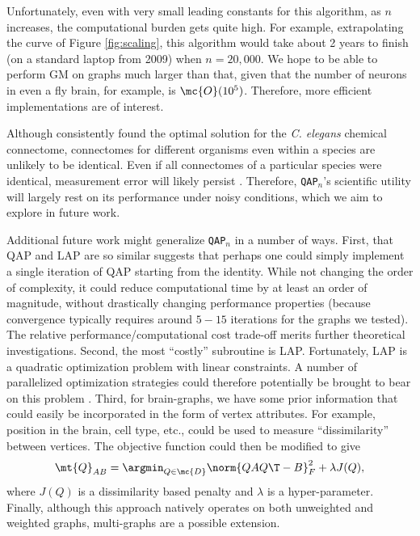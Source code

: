 \documentclass[10pt,journal,cspaper,compsoc]{IEEEtran}
\begin{document}
Unfortunately, even with very small leading constants for this algorithm, as $n$ increases, the computational burden gets quite high.  For example, extrapolating the curve of Figure \ref{fig:scaling}, this algorithm would take about 2 years to finish (on a standard laptop from 2009) when $n=20,000$.  We hope to be able to perform GM on graphs much larger than that, given that the number of neurons in even a fly brain, for example, is $\mc{O}(10^5)$.  Therefore, more efficient implementations are of interest.  

Although \qapn consistently found the optimal solution for the \emph{C. elegans} chemical connectome, connectomes for different organisms even within a species are unlikely to be identical. Even if all connectomes of a particular species were identical, measurement error will likely persist \cite{Helmstaedter2011}. Therefore, \texttt{QAP}$_n$'s scientific utility will largely rest on its performance under noisy conditions, which we aim to explore in future work.  

Additional future work might generalize \texttt{QAP}$_n$ in a number of ways.  First, that QAP and LAP are so similar suggests that perhaps one could simply implement a single iteration of QAP starting from the identity.  While not changing the order of complexity, it could reduce computational time by at least an order of magnitude, without drastically changing performance properties (because convergence typically requires around $5-15$ iterations for the graphs we tested).  The relative performance/computational cost trade-off merits further theoretical investigations.  Second, the most ``costly'' subroutine is LAP.  Fortunately, LAP is a quadratic optimization problem with linear constraints.  A number of parallelized optimization strategies could therefore potentially be brought to bear on this problem \cite{Boyd2011}.  Third, for brain-graphs, we have some prior information that could easily be incorporated in the form of vertex attributes.  For example, position in the brain, cell type, etc., could be used to measure ``dissimilarity'' between vertices.  The objective function could then be modified to give
\begin{align} \label{eq:Jqap}
	\mt{Q}_{AB}= \argmin_{Q \in \mc{D}} \norm{Q A Q\T - B}^2_F + \lambda J(Q),
\end{align}
where $J(Q)$ is a dissimilarity based penalty and $\lambda$ is a hyper-parameter.  Finally, although this approach natively operates on both unweighted and weighted graphs, multi-graphs are a possible extension.
\end{document}
